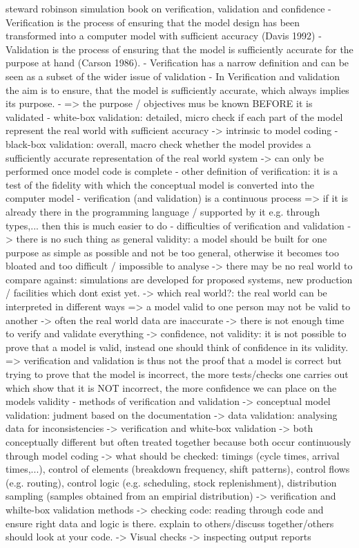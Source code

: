 steward robinson simulation book on verification, validation and confidence
- Verification is the process of ensuring that the model design has been transformed into a computer model with sufficient accuracy (Davis 1992)
- Validation is the process of ensuring that the model is sufficiently accurate for the purpose at hand (Carson 1986).
- Verification has a narrow definition and can be seen as a subset of the wider issue of validation
- In Verification and validation the aim is to ensure, that the model is sufficiently accurate, which always implies its purpose.
- => the purpose / objectives mus be known BEFORE it is validated 
- white-box validation: detailed, micro check if each part of the model represent the real world with sufficient accuracy 
	-> intrinsic to model coding
- black-box validation: overall, macro check whether the model provides a sufficiently accurate representation of the real world system
	-> can only be performed once model code is complete
- other definition of verification: it is a test of the fidelity with which the conceptual model is converted into the computer model
- verification (and validation) is a continuous process => if it is already there in the programming language / supported by it e.g. through types,... then this is much easier to do
- difficulties of verification and validation
	-> there is no such thing as general validity: a model should be built for one purpose as simple as possible and not be too general, otherwise it becomes too bloated and too difficult / impossible to analyse
	-> there may be no real world to compare against: simulations are developed for proposed systems, new production / facilities which dont exist yet. 
	-> which real world?: the real world can be interpreted in different ways => a model valid to one person may not be valid to another
	-> often the real world data are inaccurate
	-> there is not enough time to verify and validate everything
	-> confidence, not validity: it is not possible to prove that a model is valid, instead one should think of confidence in its validity. 
		=> verification and validation is thus not the proof that a model is correct but trying to prove that the model is incorrect, the more tests/checks one carries out which show that it is NOT incorrect, the more confidence we can place on the models validity
	- methods of verification and validation
	-> conceptual model validation: judment based on the documentation
	-> data validation: analysing data for inconsistencies
	-> verification and white-box validation
		-> both conceptually different but often treated together because both occur continuously through model coding
		-> what should be checked: timings (cycle times, arrival times,...), control of elements (breakdown frequency, shift patterns), control flows (e.g. routing), control logic (e.g. scheduling, stock replenishment), distribution sampling (samples obtained from an empirial distribution)
	-> verification and whilte-box validation methods
		-> checking code: reading through code and ensure right data and logic is there. explain to others/discuss together/others should look at your code. 
		-> Visual checks
		-> inspecting output reports
		
